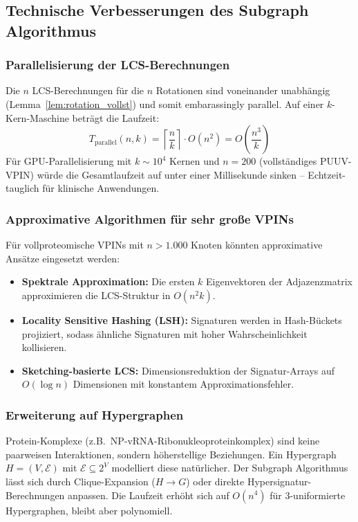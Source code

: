 ﻿\documentclass[a4paper,12pt]{article}
\theoremstyle{definition}
\begin{document}
\subsection{Technische Verbesserungen des Subgraph Algorithmus}

\subsubsection{Parallelisierung der LCS-Berechnungen}

Die $n$ LCS-Berechnungen f\"ur die $n$ Rotationen sind voneinander
unabh\"angig (Lemma~\ref{lem:rotation_vollst}) und somit embarassingly
parallel. Auf einer $k$-Kern-Maschine betr\"agt die Laufzeit:
\[
    T_{\mathrm{parallel}}(n, k) = \left\lceil \frac{n}{k} \right\rceil \cdot O(n^2) = O\!\left(\frac{n^3}{k}\right)
\]
F\"ur GPU-Parallelisierung mit $k \sim 10^4$ Kernen und $n = 200$
(vollst\"andiges PUUV-VPIN) w\"urde die Gesamtlaufzeit auf
unter einer Millisekunde sinken -- Echtzeit-tauglich f\"ur
klinische Anwendungen.

\subsubsection{Approximative Algorithmen f\"ur sehr gro{\ss}e VPINs}

F\"ur vollproteomische VPINs mit $n > 1.000$ Knoten k\"onnten
approximative Ans\"atze eingesetzt werden:
\begin{itemize}
    \item \textbf{Spektrale Approximation:} Die ersten $k$ Eigenvektoren der
          Adjazenzmatrix approximieren die LCS-Struktur in $O(n^2 k)$.
    \item \textbf{Locality Sensitive Hashing (LSH):} Signaturen werden in
          Hash-B\"uckets projiziert, sodass \"ahnliche Signaturen mit
          hoher Wahrscheinlichkeit kollisieren.
    \item \textbf{Sketching-basierte LCS:} Dimensionsreduktion der Signatur-Arrays
          auf $O(\log n)$ Dimensionen mit konstantem Approximationsfehler.
\end{itemize}

\subsubsection{Erweiterung auf Hypergraphen}

Protein-Komplexe (z.B.\ NP-vRNA-Ribonukleoproteinkomplex) sind keine
paarweisen Interaktionen, sondern h\"oherstellige Beziehungen. Ein
Hypergraph $H = (V, \mathcal{E})$ mit $\mathcal{E} \subseteq 2^V$
modelliert diese nat\"urlicher. Der Subgraph Algorithmus l\"asst sich
durch Clique-Expansion ($H \to G$) oder direkte Hypersignatur-Berechnungen
anpassen. Die Laufzeit erh\"oht sich auf $O(n^4)$ f\"ur 3-uniformierte
Hypergraphen, bleibt aber polynomiell.
\end{document}
